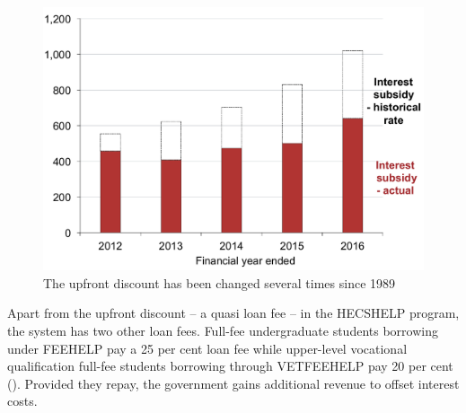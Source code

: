 \documentclass[embargoed]{grattan}
\begin{document}
\begin{figure}
\caption{The upfront discount has been changed several times since 1989}\label{fig:fig18-the-upfront-discount-has-been-changed-several-times-since-1989}

\includegraphics[page=18]{atlas/Chartpack.pdf}
\end{figure}

Apart from the upfront discount -- a quasi loan fee -- in the \gls{HECSHELP} program, the system has two other loan fees.
Full-fee undergraduate students borrowing under \gls{FEEHELP} pay a 25 per cent loan fee while upper-level vocational qualification full-fee students borrowing through \gls{VETFEEHELP} pay 20 per cent ().
Provided they repay, the government gains additional revenue to offset interest costs.
\end{document}
